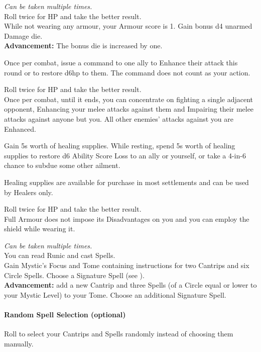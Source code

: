 \documentclass[itdr]{subfiles}
\begin{document}
\vfill
{} {\slshape Can be taken multiple times.}\\
Roll twice for HP and take the better result.\\
While not wearing any armour, your Armour score is 1. Gain bonus d4 unarmed Damage die.\\
\textbf{Advancement:} The bonus die is increased by one.

\vfill
{}
Once per combat, issue a command to one ally to Enhance their attack this round or to restore d6hp to them. The command does not count as your action.

\break

 Roll twice for HP and take the better result.\\
Once per combat, until it ends, you can concentrate on fighting a single adjacent opponent, Enhancing your melee attacks against them and Impairing their melee attacks against anyone but you. All other \mbox{enemies'} attacks against you are Enhanced.

\vfill
{}
Gain 5s worth of healing supplies.
While resting, spend 5s worth of healing supplies to restore d6 Ability Score Loss to an ally or yourself, or take a 4-in-6 chance to subdue some other ailment.

Healing supplies are available for purchase in most settlements and can be used by Healers only.

\vfill
{}
 Roll twice for HP and take the better result.\\
Full Armour does not impose its Disadvantages on you and you can employ the shield while wearing it.

\vfill
{}
 {\slshape Can be taken multiple times.}\\
You can read Runic and cast Spells.\\
Gain Mystic's Focus and Tome containing instructions for two Cantrips and six  Circle Spells. Choose a Signature Spell (see \textbf{}).\\
\textbf{Advancement:} add a new Cantrip and three Spells (of a Circle equal or lower to your Mystic Level) to your Tome. Choose an additional Signature Spell.
\begin{dbox}
	\paragraph{Random Spell Selection (optional)}
	Roll to select your Cantrips and Spells randomly instead of choosing them manually.\vspace{-1em}
\end{dbox}
\end{document}

